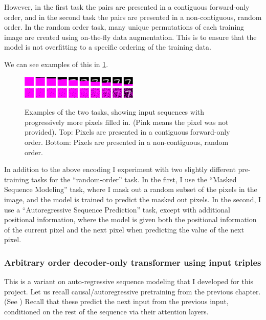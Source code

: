 However, in the first task the pairs are presented in a contiguous forward-only order, and in the second task the pairs are presented in a non-contiguous, random order. In the random order task, many unique permutations of each training image are created using on-the-fly data augmentation. This is to ensure that the model is not overfitting to a specific ordering of the training data.

We can see examples of this in \cref{fig:mnist-task-examples}.

\begin{figure}
    \centering
    \includegraphics[width=0.5\textwidth]{figures/examples-sequential.png}
    \includegraphics[width=0.5\textwidth]{figures/examples-random.png}
    \caption[Examples of the two MNIST training tasks]{Examples of the two tasks, showing input sequences with progressively more pixels filled in. (Pink means the pixel was not provided). Top: Pixels are presented in a contiguous forward-only order. Bottom: Pixels are presented in a non-contiguous, random order.}
    \label{fig:mnist-task-examples}
\end{figure}

In addition to the above encoding I experiment with two slightly different pre-training tasks for the ``random-order'' task. In the first, I use the ``Masked Sequence Modeling'' task, where I mask out a random subset of the pixels in the image, and the model is trained to predict the masked out pixels. In the second, I use a ``Autoregressive Sequence Prediction'' task, except with additional positional information, where the model is given both the positional information of the current pixel and the next pixel when predicting the value of the next pixel.

\subsubsection{Arbitrary order decoder-only transformer using input triples}
\label{sss:decoder-only-triples}

This is a variant on auto-regressive sequence modeling that I developed for this project. Let us recall causal/autoregressive pretraining from the previous chapter. (See ) Recall that these predict the next input from the previous input, conditioned on the rest of the sequence via their attention layers.

